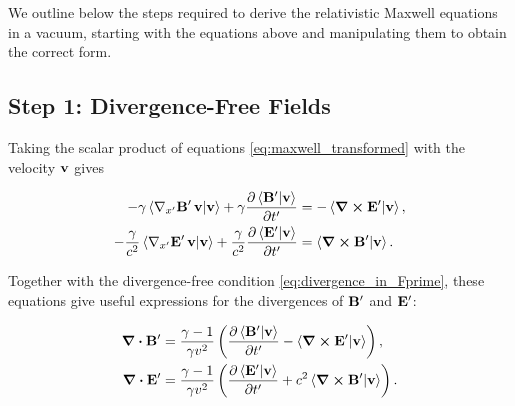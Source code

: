 \documentclass[12pt]{article}
\begin{document}
We outline below the steps required to derive the relativistic Maxwell equations in a vacuum,
starting with the equations above and manipulating them to obtain the correct form.


\subsection{Step 1: Divergence-Free Fields}

Taking the scalar product of equations \eqref{eq:maxwell_transformed} with the velocity
$\vb{v}$ gives

\begin{align}
  -\gamma\ip{\nabla_{x'}\vb{B}'\,\vb{v}}{\vb{v}}
    + \gamma\pdv{\ip{\vb{B}'}{\vb{v}}}{t'}
    &= -\ip{\curl \vb{E}'}{\vb{v}},
    \\
  -\frac{\gamma}{c^2}\ip{\nabla_{x'}\vb{E}'\,\vb{v}}{\vb{v}}
    + \frac{\gamma}{c^2}\pdv{\ip{\vb{E}'}{\vb{v}}}{t'}
    &= \ip{\curl \vb{B}'}{\vb{v}}.
\end{align}

Together with the divergence-free condition \eqref{eq:divergence_in_Fprime}, these equations
give useful expressions for the divergences of $\vb{B}'$ and $\vb{E}'$:

\begin{align}
  \div \vb{B}'
    &=
    \frac{\gamma-1}{\gamma v^2}
    \left(
      \pdv{\ip{\vb{B}'}{\vb{v}}}{t'}
      -
      \ip{\curl \vb{E}'}{\vb{v}}
    \right),
    \\
  \div \vb{E}'
    &=
    \frac{\gamma-1}{\gamma v^2}
    \left(
      \pdv{\ip{\vb{E}'}{\vb{v}}}{t'}
      +
      c^2\ip{\curl \vb{B}'}{\vb{v}}
    \right).
\end{align}
\end{document}
